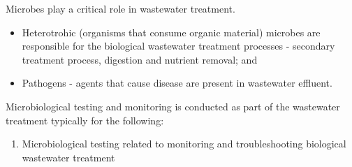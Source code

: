 			Microbes play a critical role in wastewater treatment.  
			\begin{itemize}
				\item Heterotrohic (organisms that consume organic material) microbes are responsible for the biological wastewater treatment processes - secondary treatment process, digestion and nutrient removal; and
				\item Pathogens - agents that cause disease are present in wastewater effluent.
			\end{itemize}
Microbiological testing and monitoring is conducted as part of the wastewater treatment typically for the following:
\begin{enumerate}[1.]
				
				\item Microbiological testing related to monitoring and troubleshooting biological wastewater treatment\\
				

\end{enumerate}
